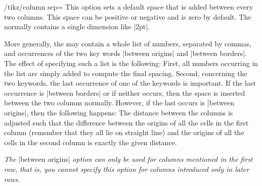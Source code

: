 \begin{key}{/tikz/column sep=}
    This option sets a default space that is added between every two columns.
    This space can be positive or negative and is zero by default. The
     normally contains a single dimension like |2pt|.
\begin{codeexample}[]
\end{codeexample}
    More generally, the  may contain a whole list of
    numbers, separated by commas, and occurrences of the two key words
    |between origins| and |between borders|. The effect of specifying such a
    list is the following: First, all numbers occurring in the list are simply
    added to compute the final spacing. Second, concerning the two keywords,
    the last occurrence of one of the keywords is important. If the last
    occurrence is |between borders| or if neither occurs, then the space is
    inserted between the two columns normally. However, if the last occurs is
    |between origins|, then the following happens: The distance between the
    columns is adjusted such that the difference between the origins of all the
    cells in the first column (remember that they all lie on straight line) and
    the origins of all the cells in the second column is exactly the given
    distance.

    \emph{The }|between origins|\emph{ option can only be used for columns
    mentioned in the first row, that is, you cannot specify this option for
    columns introduced only in later rows.}
\begin{codeexample}[]
\end{codeexample}
\end{key}

